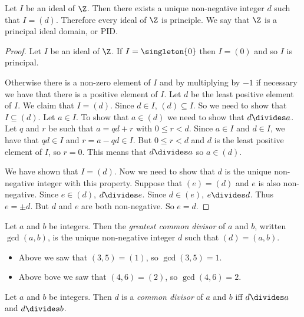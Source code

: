 \documentclass[oneside,12pt]{amsart}
\begin{document}
\begin{theorem}[$\Z$ is a PID]
\label{ZIsAPID}
Let $I$ be an ideal of $\Z$. Then there exists a unique non-negative integer
 $d$
such that $I=(d)$.
Therefore every ideal of $\Z$ is principle. We say that $\Z$ is a principal ideal domain,
or PID.
\end{theorem}
\begin{proof}
Let $I$ be an ideal of $\Z$. If $I=\singleton{0}$ then $I=(0)$ and so $I$ is
principal.

Otherwise
there is a non-zero element of $I$ and by multiplying by $-1$ if necessary
we have that there is a positive element of $I$. Let $d$ be the least positive
element of $I$. We claim that $I=(d)$. Since $d\in I$, $(d)\subseteq I$.
So we need to show that $I\subseteq (d)$. Let $a\in I$. To show that $a\in (d)$
we need to show that $d\divides a$. Let $q$ and $r$ be such that
$a=qd+r$ with $0\leq r < d$. Since $a\in I$ and $d\in I$, we have that
$qd\in I$ and $r=a-qd\in I$. But $0\leq r<d$ and $d$ is the least positive element
of $I$, so $r=0$. This means that $d \divides a$ so $a\in (d)$.

We have shown that $I=(d)$. Now we need to show that $d$ is the unique
non-negative integer with this property. Suppose
that $(e) = (d)$ and $e$ is also non-negative. Since
$e\in (d)$, $d\divides e$. Since $d\in (e)$, $e\divides d$.
Thus $e = \pm d$. But $d$ and $e$ are both non-negative. So
$e=d$.
\end{proof}

\begin{definition}[GCD]
Let $a$ and $b$ be integers. Then the \emph{greatest common divisor} of
$a$ and $b$, written $\gcd(a,b)$, is the unique non-negative integer $d$
such that $(d) = (a,b)$.
\end{definition}

\begin{in_class_example}
\quad
\begin{itemize}
\item Above we saw that $(3,5) = (1)$, so $\gcd(3,5) = 1$.

\item Above bove we saw that $(4,6) = (2)$, so $\gcd(4,6) = 2$.
\end{itemize}
\end{in_class_example}

\begin{definition}
Let $a$ and $b$ be integers. Then $d$ is a \emph{common divisor} of $a$ and $b$
iff $d\divides a$ and $d\divides b$.
\end{definition}
\end{document}
